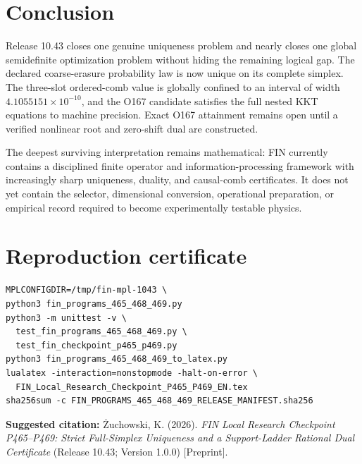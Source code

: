 \documentclass[11pt,a4paper,openany]{report}
\begin{document}
\chapter{Conclusion}

Release 10.43 closes one genuine uniqueness problem and nearly closes one global semidefinite optimization problem without hiding the remaining logical gap. The declared coarse-erasure probability law is now unique on its complete simplex. The three-slot ordered-comb value is globally confined to an interval of width \(4.1055151\times10^{-10}\), and the O167 candidate satisfies the full nested KKT equations to machine precision. Exact O167 attainment remains open until a verified nonlinear root and zero-shift dual are constructed.

The deepest surviving interpretation remains mathematical: FIN currently contains a disciplined finite operator and information-processing framework with increasingly sharp uniqueness, duality, and causal-comb certificates. It does not yet contain the selector, dimensional conversion, operational preparation, or empirical record required to become experimentally testable physics.


\clearpage\chapter*{Reproduction certificate}
\begin{Verbatim}[fontsize=\small]
MPLCONFIGDIR=/tmp/fin-mpl-1043 \
python3 fin_programs_465_468_469.py
python3 -m unittest -v \
  test_fin_programs_465_468_469.py \
  test_fin_checkpoint_p465_p469.py
python3 fin_programs_465_468_469_to_latex.py
lualatex -interaction=nonstopmode -halt-on-error \
  FIN_Local_Research_Checkpoint_P465_P469_EN.tex
sha256sum -c FIN_PROGRAMS_465_468_469_RELEASE_MANIFEST.sha256
\end{Verbatim}
\noindent\textbf{Suggested citation:}
\.Zuchowski, K. (2026). \emph{FIN Local Research Checkpoint P465--P469:
Strict Full-Simplex Uniqueness and a Support-Ladder Rational Dual Certificate}
(Release 10.43; Version 1.0.0) [Preprint].
\end{document}
